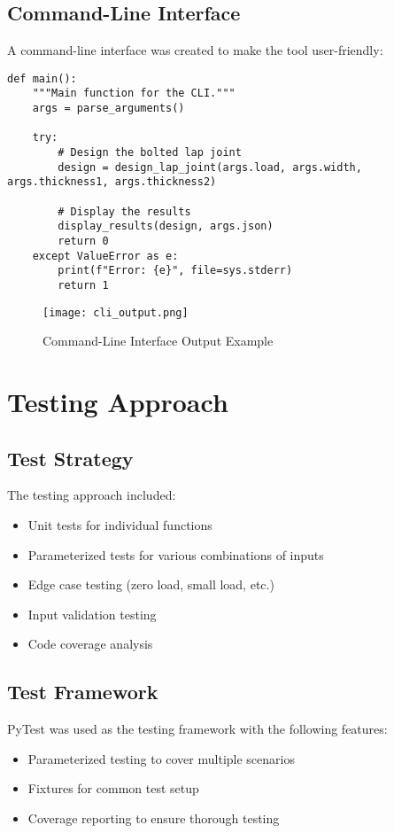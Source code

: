 \documentclass[12pt,a4paper]{article}
\begin{document}
\subsection{Command-Line Interface}
A command-line interface was created to make the tool user-friendly:

\begin{lstlisting}
def main():
    """Main function for the CLI."""
    args = parse_arguments()
    
    try:
        # Design the bolted lap joint
        design = design_lap_joint(args.load, args.width, args.thickness1, args.thickness2)
        
        # Display the results
        display_results(design, args.json)
        return 0
    except ValueError as e:
        print(f"Error: {e}", file=sys.stderr)
        return 1
\end{lstlisting}

\begin{figure}[H]
\centering
\texttt{[image: cli\_output.png]}
\caption{Command-Line Interface Output Example}
\label{fig:cli}
\end{figure}

\section{Testing Approach}
\subsection{Test Strategy}
The testing approach included:
\begin{itemize}
    \item Unit tests for individual functions
    \item Parameterized tests for various combinations of inputs
    \item Edge case testing (zero load, small load, etc.)
    \item Input validation testing
    \item Code coverage analysis
\end{itemize}

\subsection{Test Framework}
PyTest was used as the testing framework with the following features:
\begin{itemize}
    \item Parameterized testing to cover multiple scenarios
    \item Fixtures for common test setup
    \item Coverage reporting to ensure thorough testing
\end{itemize}
\end{document}
